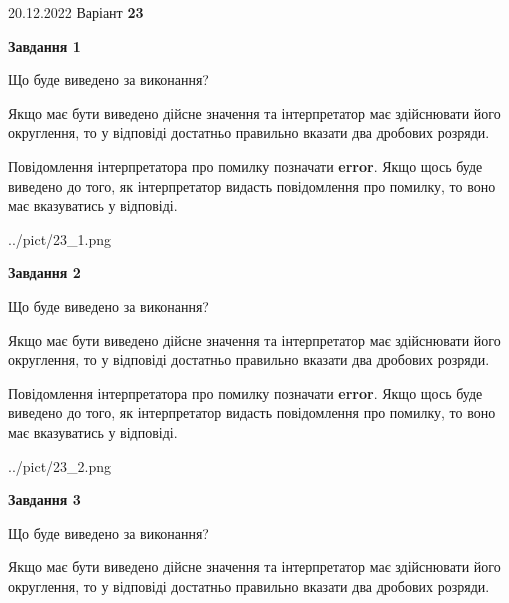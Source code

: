 \documentclass[12pt, ukrainian]{article}
\begin{document}
{20.12.2022 Варіант \No \textbf { 23 }\par}
{
\begin {Large}

{\begin {center}\textbf{Завдання 1}\end {center}}\par
Що буде виведено за виконання? \par

Якщо має бути виведено дійсне значення та інтерпретатор має здійснювати його округлення, 
то у відповіді достатньо правильно вказати два дробових розряди.

Повідомлення інтерпретатора про помилку позначати \textbf{error}.
Якщо щось буде виведено до того, як інтерпретатор видасть повідомлення про помилку, 
то воно має вказуватись у відповіді. \par

\begin{center}
	{../pict/23_1.png}
\end{center}
\newpage

{\begin {center}\textbf{Завдання 2}\end {center}}\par
Що буде виведено за виконання? \par

Якщо має бути виведено дійсне значення та інтерпретатор має здійснювати його округлення, 
то у відповіді достатньо правильно вказати два дробових розряди.

Повідомлення інтерпретатора про помилку позначати \textbf{error}.
Якщо щось буде виведено до того, як інтерпретатор видасть повідомлення про помилку, 
то воно має вказуватись у відповіді. \par

\begin{center}
	{../pict/23_2.png}
\end{center}
\newpage

{\begin {center}\textbf{Завдання 3}\end {center}}\par
Що буде виведено за виконання? \par

Якщо має бути виведено дійсне значення та інтерпретатор має здійснювати його округлення, 
то у відповіді достатньо правильно вказати два дробових розряди.


\end{Large}}
\end{document}
